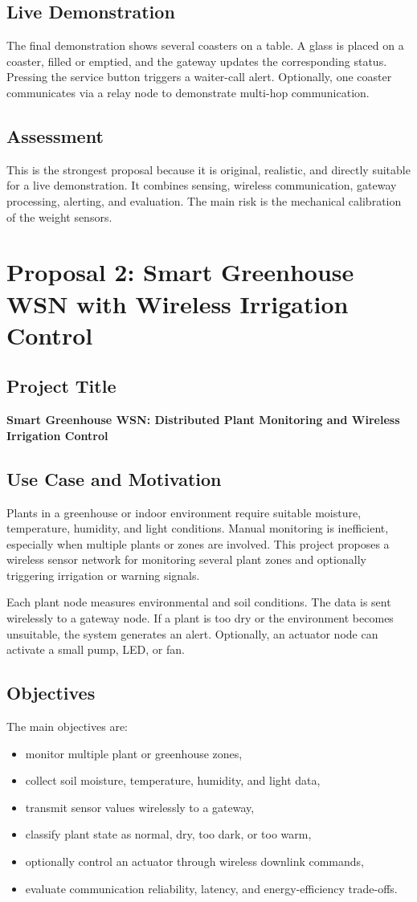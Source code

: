 \documentclass[11pt,a4paper]{article}
\newcommand{\projecttitle}[1]{\subsection*{#1}}
\begin{document}
\projecttitle{Live Demonstration}

The final demonstration shows several coasters on a table. A glass is placed on a coaster, filled or emptied, and the gateway updates the corresponding status. Pressing the service button triggers a waiter-call alert. Optionally, one coaster communicates via a relay node to demonstrate multi-hop communication.

\projecttitle{Assessment}

This is the strongest proposal because it is original, realistic, and directly suitable for a live demonstration. It combines sensing, wireless communication, gateway processing, alerting, and evaluation. The main risk is the mechanical calibration of the weight sensors.

\newpage

\section{Proposal 2: Smart Greenhouse WSN with Wireless Irrigation Control}

\projecttitle{Project Title}

\textbf{Smart Greenhouse WSN: Distributed Plant Monitoring and Wireless Irrigation Control}

\projecttitle{Use Case and Motivation}

Plants in a greenhouse or indoor environment require suitable moisture, temperature, humidity, and light conditions. Manual monitoring is inefficient, especially when multiple plants or zones are involved. This project proposes a wireless sensor network for monitoring several plant zones and optionally triggering irrigation or warning signals.

Each plant node measures environmental and soil conditions. The data is sent wirelessly to a gateway node. If a plant is too dry or the environment becomes unsuitable, the system generates an alert. Optionally, an actuator node can activate a small pump, LED, or fan.

\projecttitle{Objectives}

The main objectives are:

\begin{itemize}
    \item monitor multiple plant or greenhouse zones,
    \item collect soil moisture, temperature, humidity, and light data,
    \item transmit sensor values wirelessly to a gateway,
    \item classify plant state as normal, dry, too dark, or too warm,
    \item optionally control an actuator through wireless downlink commands,
    \item evaluate communication reliability, latency, and energy-efficiency trade-offs.
\end{itemize}
\end{document}
